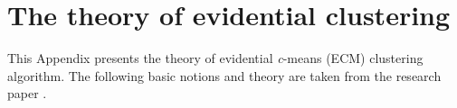 \chapter{The theory of evidential clustering}
\normalsize
\label{The evidential c-means clustering algorithm}
This Appendix presents the theory of evidential \textit{c}-means (ECM) clustering algorithm. The following basic notions and theory are taken from the research paper \cite{masson2008ecm}.

